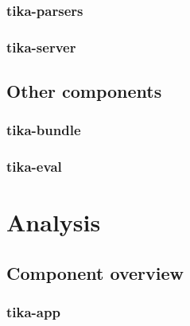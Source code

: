 \documentclass{article}
\begin{document}
\subsubsection{tika-parsers}
\subsubsection{tika-server}

\subsection{Other components}
\subsubsection{tika-bundle}
\subsubsection{tika-eval}



\appendix
\section{Analysis}
\subsection{Component overview}
\subsubsection{tika-app}
\end{document}
